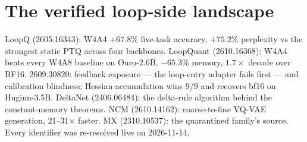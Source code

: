 \section{The verified loop-side landscape}

LoopQ (2605.16343): W4A4 $+67.8\%$ five-task accuracy, $+75.2\%$ perplexity vs the strongest
static PTQ across four backbones. LoopQuant (2610.16368): W4A4 beats every W4A8 baseline on
Ouro-2.6B, $-65.3\%$ memory, $1.7\times$ decode over BF16. 2609.30820: feedback exposure ---
the loop-entry adapter fails first --- and calibration blindness; Hessian accumulation wins
9/9 and recovers bf16 on Huginn-3.5B. DeltaNet (2406.06484): the delta-rule algorithm behind
the constant-memory theorems. NCM (2610.14162): coarse-to-fine VQ-VAE generation, 21--31$\times$
faster. MX (2310.10537): the quarantined family's source. Every identifier was re-resolved
live on 2026-11-14.
